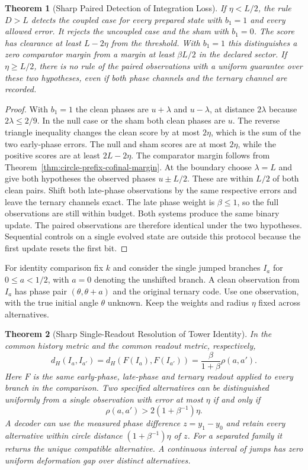 \documentclass[11pt,a4paper]{article}
\newtheorem{theorem}{Theorem}[section]
\theoremstyle{definition}
\begin{document}
\begin{theorem}[Sharp Paired Detection of Integration Loss]\label{thm:paired-integration-rupture}
If $\eta<L/2$, the rule $D>L$ detects the coupled case for every prepared state with $b_1=1$ and every allowed error. It rejects the uncoupled case and the sham with $b_1=0$. The score has clearance at least $L-2\eta$ from the threshold. With $b_1=1$ this distinguishes a zero comparator margin from a margin at least $\beta L/2$ in the declared sector. If $\eta\ge L/2$, there is no rule of the paired observations with a uniform guarantee over these two hypotheses, even if both phase channels and the ternary channel are recorded.
\end{theorem}

\begin{proof}
With $b_1=1$ the clean phases are $u+\lambda$ and $u-\lambda$, at distance $2\lambda$ because $2\lambda\le2/9$. In the null case or the sham both clean phases are $u$. The reverse triangle inequality changes the clean score by at most $2\eta$, which is the sum of the two early-phase errors. The null and sham scores are at most $2\eta$, while the positive scores are at least $2L-2\eta$. The comparator margin follows from Theorem~\ref{thm:circle-prefix-cofinal-margin}. At the boundary choose $\lambda=L$ and give both hypotheses the observed phases $u\pm L/2$. These are within $L/2$ of both clean pairs. Shift both late-phase observations by the same respective errors and leave the ternary channels exact. The late phase weight is $\beta\le1$, so the full observations are still within budget. Both systems produce the same binary update. The paired observations are therefore identical under the two hypotheses. Sequential controls on a single evolved state are outside this protocol because the first update resets the first bit.
\end{proof}

For identity comparison fix $k$ and consider the single jumped branches $I_a$ for $0\le a<1/2$, with $a=0$ denoting the unshifted branch. A clean observation from $I_a$ has phase pair $(\theta,\theta+a)$ and the original ternary code. Use one observation, with the true initial angle $\theta$ unknown. Keep the weights and radius $\eta$ fixed across alternatives.

\begin{theorem}[Sharp Single-Readout Resolution of Tower Identity]\label{thm:tower-identity-observation-resolution}
In the common history metric and the common readout metric, respectively,
\[
 d_H(I_a,I_{a'})=d_H(F(I_a),F(I_{a'}))
 =\frac{\beta}{1+\beta}\rho(a,a').
\]
Here $F$ is the same early-phase, late-phase and ternary readout applied to every branch in the comparison. Two specified alternatives can be distinguished uniformly from a single observation with error at most $\eta$ if and only if
\[
 \rho(a,a')>2(1+\beta^{-1})\eta.
\]
A decoder can use the measured phase difference $z=y_1-y_0$ and retain every alternative within circle distance $(1+\beta^{-1})\eta$ of $z$. For a separated family it returns the unique compatible alternative. A continuous interval of jumps has zero uniform deformation gap over distinct alternatives.
\end{theorem}
\end{document}
